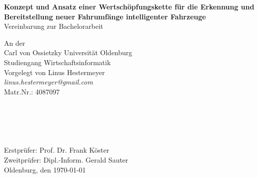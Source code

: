 \documentclass{article}
\begin{document}
\begin{titlepage}
    \begin{figure}[H]
    	\centering
    \end{figure}
 
    \begin{center}
        \large{\textbf{Konzept und Ansatz einer Wertschöpfungskette für die Erkennung und Bereitstellung neuer Fahrumfänge intelligenter Fahrzeuge}}\\
        \large Vereinbarung zur Bachelorarbeit
    \end{center}
    \vfill
    \large{
        An der\\
        Carl von Ossietzky Universität Oldenburg\\
        Studiengang Wirtschaftsinformatik\\
        
	    \noindent
	    Vorgelegt von Linus Hestermeyer\\ 
        \textit{linus.hestermeyer@gmail.com}\\
        Matr.Nr.: 4087097
        \\\\\\\\\\\\
        Erstprüfer: Prof. Dr. Frank Köster\\
        Zweitprüfer: Dipl.-Inform. Gerald Sauter\\
        \vfill
        \noindent
        Oldenburg, den \today
    }
\end{titlepage}
\thispagestyle{empty}
\clearpage
{}
\end{document}
